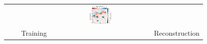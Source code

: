 \begin{figure}[h!]
\small
\begin{center}
\setlength{\tabcolsep}{1pt}
\begin{tabular}{ccccc}
 &&
&\hspace{-30mm} \includegraphics[trim={8mm 7cm 22mm 0},clip,width=5.0cm,height=1cm]{figures/plots/horizontal_cbar_vort.png} &\\
\hspace{0mm} &&
\hspace{-30mm} Training  
\hspace{3mm}  & 
 & 
\hspace{-30mm} Reconstruction \\



\end{tabular}
\end{center}
\end{figure}
